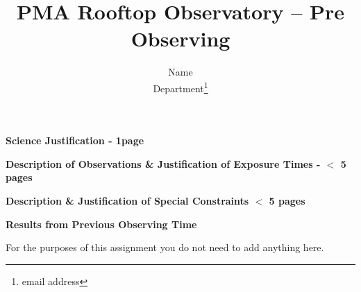 \documentclass[11pt]{article}
\title{PMA Rooftop Observatory -- Pre Observing }
\author{ Name\\  Department\thanks{email address} }
\begin{document}
\maketitle


\begin{center}{\bf Science Justification - 1page}\end{center}

\newpage

\begin{center}{\bf Description of Observations \& Justification of Exposure Times - $<$ 5 pages}
\end{center}

\newpage
\begin{center}{\bf Description \& Justification of Special Constraints $<$ 5 pages}\end{center}

\newpage
\begin{center}{\bf Results from Previous Observing Time }\end{center}
For the purposes of this assignment you do not need to add anything here. 
\end{document}

